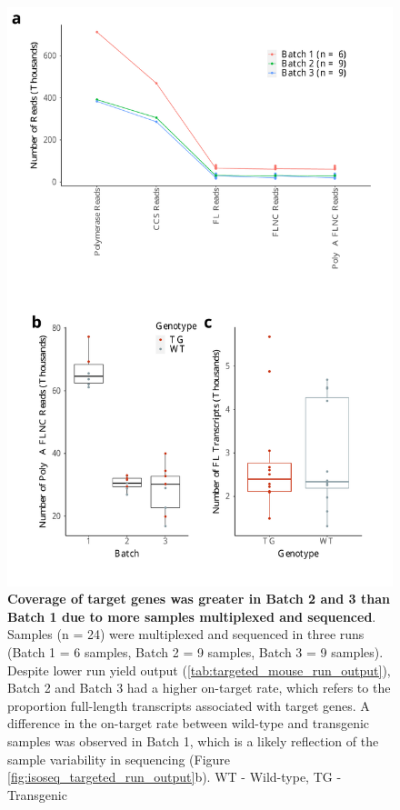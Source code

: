 \begin{figure}[!htp]
	\begin{center}
		\includegraphics[page=2,trim={0 25cm 0 0},clip,scale = 0.55]{Figures/TargetedTranscriptome.pdf}
	\end{center}
	\captionsetup{width=0.95\textwidth}
	\caption[On-Target rate in Transcriptome Iso-Seq runs]%
	{\textbf{Coverage of target genes was greater in Batch 2 and 3 than Batch 1 due to more samples multiplexed and sequenced}. Samples (n = 24) were multiplexed and sequenced in three runs (Batch 1 = 6 samples, Batch 2 = 9 samples, Batch 3 = 9 samples). Despite lower run yield output (\ref{tab:targeted_mouse_run_output}), Batch 2 and Batch 3 had a higher on-target rate, which refers to the proportion full-length transcripts associated with target genes. A difference in the on-target rate between wild-type and transgenic samples was observed in Batch 1, which is a likely reflection of the sample variability in sequencing (Figure \ref{fig:isoseq_targeted_run_output}b). WT - Wild-type, TG - Transgenic}
	\label{fig:isoseq_targeted_rate}
\end{figure}


